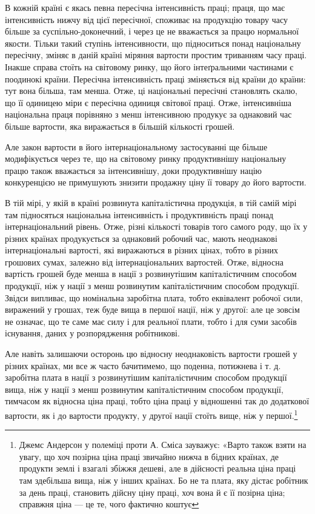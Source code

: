 В кожній країні є якась певна пересічна інтенсивність праці;
праця, що має інтенсивність нижчу від цієї пересічної, споживає
на продукцію товару часу більше за суспільно-доконечний,
і через це не вважається за працю нормальної якости. Тільки
такий ступінь інтенсивности, що підноситься понад національну
пересічну, зміняє в даній країні міряння вартости простим триванням
часу праці. Інакше справа стоїть на світовому ринку,
що його інтеґральними частинами є поодинокі країни. Пересічна
інтенсивність праці зміняється від країни до країни: тут вона
більша, там менша. Отже, ці національні пересічні становлять
скалю, що її одиницею міри є пересічна одиниця світової праці.
Отже, інтенсивніша національна праця порівняно з менш інтенсивною
продукує за однаковий час більше вартости, яка виражається
в більшій кількості грошей.

Але закон вартости в його інтернаціональному застосуванні
ще більше модифікується через те, що на світовому ринку продуктивнішу
національну працю також вважається за інтенсивнішу,
доки продуктивнішу націю конкуренцією не примушують
знизити продажну ціну її товару до його вартости.

В тій мірі, у якій в країні розвинута капіталістична продукція,
в тій самій мірі там підносяться національна інтенсивність і
продуктивність праці понад інтернаціональний рівень. Отже,
різні кількості товарів того самого роду, що їх у різних країнах
продукується за однаковий робочий час, мають неоднакові інтернаціональні
вартості, які виражаються в різних цінах, тобто
в різних грошових сумах, залежно від інтернаціональних вартостей.
Отже, відносна вартість грошей буде менша в нації з
розвинутішим капіталістичним способом продукції, ніж у нації
з менш розвинутим капіталістичним способом продукції. Звідси
випливає, що номінальна заробітна плата, тобто еквівалент робочої
сили, виражений у грошах, теж буде вища в першої нації,
ніж у другої: але це зовсім не означає, що те саме має силу і
для реальної плати, тобто і для суми засобів існування, даних
у розпорядження робітникові.

Але навіть залишаючи осторонь цю відносну неоднаковість
вартости грошей у різних країнах, ми все ж часто бачитимемо,
що поденна, потижнева і т. д. заробітна плата в нації з розвинутішим
капіталістичним способом продукції вища, ніж у нації
з менш розвинутим капіталістичним способом продукції, тимчасом
як відносна ціна праці, тобто ціна праці у відношенні
так до додаткової вартости, як і до вартости продукту, у другої
нації стоїть вище, ніж у першої.\footnote{
Джемс Андерсон у полеміці проти А. Сміса зауважує: «Варто
також взяти на увагу, що хоч позірна ціна праці звичайно нижча в бідних
країнах, де продукти землі і взагалі збіжжя дешеві, але в дійсності
реальна ціна праці там здебільша вища, ніж у інших країнах. Бо не та
плата, яку дістає робітник за день праці, становить дійсну ціну праці,
хоч вона й є її позірна ціна; справжня ціна — це те, чого фактично коштує
}

